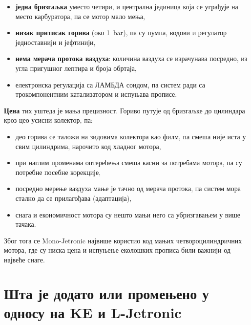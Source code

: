 \documentclass{report}
\begin{document}
\begin{itemize}[noitemsep]
    \item \textbf{једна бризгаљка} уместо четири, и централна јединица која се
          уграђује на место карбуратора, па се мотор мало мења,
    \item \textbf{низак притисак горива} (око 1~bar), па су пумпа, водови и
          регулатор једноставнији и јефтинији,
    \item \textbf{нема мерача протока ваздуха}: количина ваздуха се израчунава
          посредно, из угла пригушног лептира и броја обртаја,
    \item електронска регулација са ЛАМБДА сондом, па систем ради са
          трокомпонентним катализатором и испуњава прописе.
\end{itemize}

\textbf{Цена} тих уштеда је мања прецизност. Гориво путује од бризгаљке до
цилиндара кроз цео усисни колектор, па:

\begin{itemize}[noitemsep]
    \item део горива се таложи на зидовима колектора као филм, па смеша није
          иста у свим цилиндрима, нарочито код хладног мотора,
    \item при наглим променама оптерећења смеша касни за потребама мотора, па
          су потребне посебне корекције,
    \item посредно мерење ваздуха мање је тачно од мерача протока, па систем
          мора стално да се прилагођава (адаптација),
    \item снага и економичност мотора су нешто мањи него са убризгавањем у
          више тачака.
\end{itemize}

Због тога се Mono-Jetronic највише користио код мањих четвороцилиндричних
мотора, где су ниска цена и испуњење еколошких прописа били важнији од највеће
снаге.

\section{Шта је додато или промењено у односу на KE и L-Jetronic}
\end{document}
